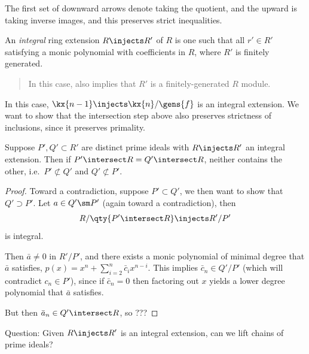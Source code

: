 The first set of downward arrows denote taking the quotient, and the
upward is taking inverse images, and this preserves strict inequalities.

\begin{definition}

An \emph{integral} ring extension \(R\injects R'\) of \(R\) is one such
that all \(r' \in R'\) satisfying a monic polynomial with coefficients
in \(R\), where \(R'\) is finitely generated.

\begin{quote}
In this case, also implies that \(R'\) is a finitely-generated \(R\)
module.
\end{quote}

\end{definition}

In this case, \(\kx{n-1} \injects \kx{n} /\gens{f}\) is an integral
extension. We want to show that the intersection step above also
preserves strictness of inclusions, since it preserves primality.

\begin{lemma}

Suppose \(P', Q' \subset R'\) are distinct prime ideals with
\(R\injects R'\) an integral extension. Then if
\(P'\intersect R = Q'\intersect R\), neither contains the other,
i.e.~\(P'\not\subset Q'\) and \(Q'\not\subset P'\).

\end{lemma}

\begin{proof}

Toward a contradiction, suppose \(P' \subset Q'\), we then want to show
that \(Q'\supset P'\). Let \(a\in Q'\sm P'\) (again toward a
contradiction), then
\begin{align*}  
R/\qty{P'\intersect R} \injects R'/P'
\end{align*} is integral.

Then \(\bar a \neq 0\) in \(R'/P'\), and there exists a monic polynomial
of minimal degree that \(\bar a\) satisfies,
\(p(x) = x^n + \sum_{i=2}^n \bar c_i x^{n-i}\). This implies
\(\bar c_n \in Q'/P'\) (which will contradict \(c_n \in P'\)), since if
\(\bar c_n = 0\) then factoring out \(x\) yields a lower degree
polynomial that \(\bar a\) satisfies.

But then \(\bar a_n \in Q'\intersect R\), so ???

\end{proof}

Question: Given \(R\injects R'\) is an integral extension, can we lift
chains of prime ideals?

